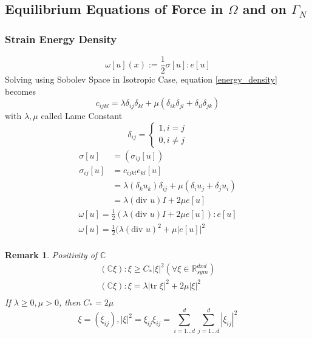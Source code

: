 \documentclass[a4paper,12pt]{article}
\newtheorem{remark}{Remark}[]
\newcommand{\R}{\mathbb{R}}
\newcommand{\C}{\mathbb{C}}
\begin{document}
\subsection{Equilibrium Equations of Force in $\Omega$ and on $\Gamma_N$}
\subsubsection{Strain Energy Density}
\begin{equation}
\label{energy_density}
\omega[u](x) := \frac{1}{2} \sigma[u] : e[u]
\end{equation}
Solving using Sobolev Space in Isotropic Case, equation \ref{energy_density} becomes
\begin{equation}\nonumber
c_{ijkl} = \lambda \delta_{ij} \delta_{kl} + \mu(\delta_{ik} \delta_{jl} + \delta_{il} \delta_{jk})
\end{equation}
with $\lambda, \mu$ called Lame Constant
\begin{equation}\nonumber
\delta_{ij} = \begin{cases}
1, i = j\\
0, i \neq j
\end{cases}
\end{equation}
\begin{equation}\nonumber
\begin{aligned}
\sigma[u] &= (\sigma_{ij}[u])\\
\sigma_{ij}[u] &= c_{ijkl} e_{kl}[u]\\
&= \lambda(\delta_k u_k)\delta_{ij} + \mu(\delta_i u_j + \delta_j u_i)\\
&= \lambda(\text{div } u) I + 2\mu e[u]
\end{aligned}
\end{equation}
\begin{equation}\nonumber
\begin{aligned}
\omega[u] = \frac{1}{2} (\lambda(\text{div } u) I + 2\mu e[u]) : e[u]\\
\omega[u] = \frac{1}{2} (\lambda(\text{div } u)^2 + \mu |e[u]|^2\\
\end{aligned}
\end{equation}
\begin{remark}
Positivity of $\C$
\begin{equation}\nonumber
\begin{aligned}
(\C \xi) : \xi \geq C_* |\xi|^2 (\forall \xi \in \R^{d x d}_{sym})\\
(\C \xi) : \xi = \lambda |\text{tr }\xi|^2 + 2\mu|\xi|^2\\
\end{aligned}
\end{equation}
If $\lambda \geq 0, \mu > 0$, then $C_* = 2 \mu$
\begin{equation}\nonumber
\xi = (\xi_{ij}), |\xi|^2 = \xi_{ij} \xi_{ij} = \sum_{i = 1 \dots d}^{d} \sum_{j = 1 \dots d}^{d} |\xi_{ij}|^2
\end{equation}
\end{remark}
\end{document}
